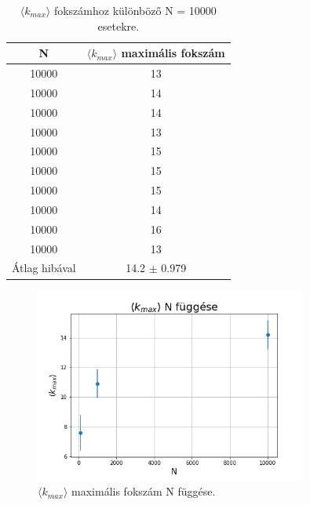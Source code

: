 \documentclass[a4paper, 12pt]{article}
\numberwithin{equation}{section}          %
\numberwithin{figure}{subsection}
\begin{document}
\begin{table}[ht!]
	\begin{center}
		\begin{tabular}{||c|c||}
			\hline
			N & $\langle k_{max} \rangle$ maximális fokszám \\  \hline
			10000 & 13 \\	\hline
			10000 & 14 \\	\hline
			10000 & 14\\	\hline
			10000 & 13\\	\hline
			10000 & 15\\	\hline
			10000 & 15\\	\hline
			10000 & 15\\	\hline
			10000 & 14\\	\hline
			10000& 16\\	\hline
			10000 & 13\\	\hline
			Átlag hibával & 14.2 $\pm$ 0.979\\  \hline
		\end{tabular}
		\caption{$\langle k_{max} \rangle$ fokszámhoz különböző N = 10000 esetekre.}
	\end{center}
\end{table}

\begin{figure}[h!]
	\begin{center}
		\includegraphics[width=0.8\textwidth]{kmax.png}
	\end{center}
	\caption{$\langle k_{max} \rangle$ maximális fokszám N függése.}
\end{figure}
\end{document}
